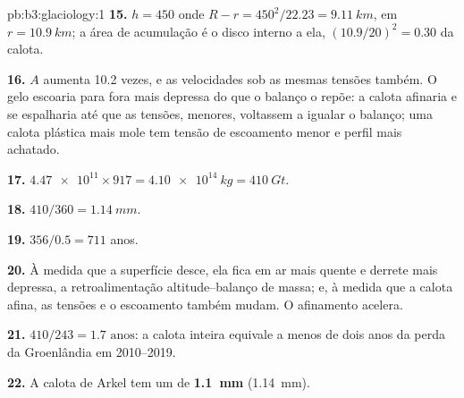 \begin{solution}{pb:b3:glaciology:1}
\textbf{15.} $h = 450$ onde $R - r = 450^2/22.23 = \qty{9.11}{km}$, em
$r = \qty{10.9}{km}$; a área de acumulação é o disco interno a ela, $(10.9/
20)^2 = 0.30$ da calota.

\textbf{16.} $A$ aumenta \num{10.2} vezes, e as velocidades sob as mesmas
tensões também. O gelo escoaria para fora mais depressa do que o balanço o
repõe: a calota afinaria e se espalharia até que as tensões, menores,
voltassem a igualar o balanço; uma calota plástica mais mole tem tensão de escoamento menor e
perfil mais achatado.

\textbf{17.} $\num{4.47e11}\times917 = \qty{4.10e14}{kg} = \qty{410}{Gt}$.

\textbf{18.} $410/360 = \qty{1.14}{mm}$.

\textbf{19.} $356/0.5 = 711$ anos.

\textbf{20.} À medida que a superfície desce, ela fica em ar mais quente e derrete mais depressa,
a retroalimentação altitude--balanço de massa; e, à medida que a calota afina, as tensões e o
escoamento também mudam. O afinamento acelera.

\textbf{21.} $410/243 = \num{1.7}\text{ anos}$: a calota inteira equivale a menos de dois
anos da perda da Groenlândia em 2010--2019.

\textbf{22.} A calota de Arkel tem um  de
\textbf{\qty[text-series-to-math=true]{1.1}{mm}} (\qty{1.14}{mm}).
\end{solution}
